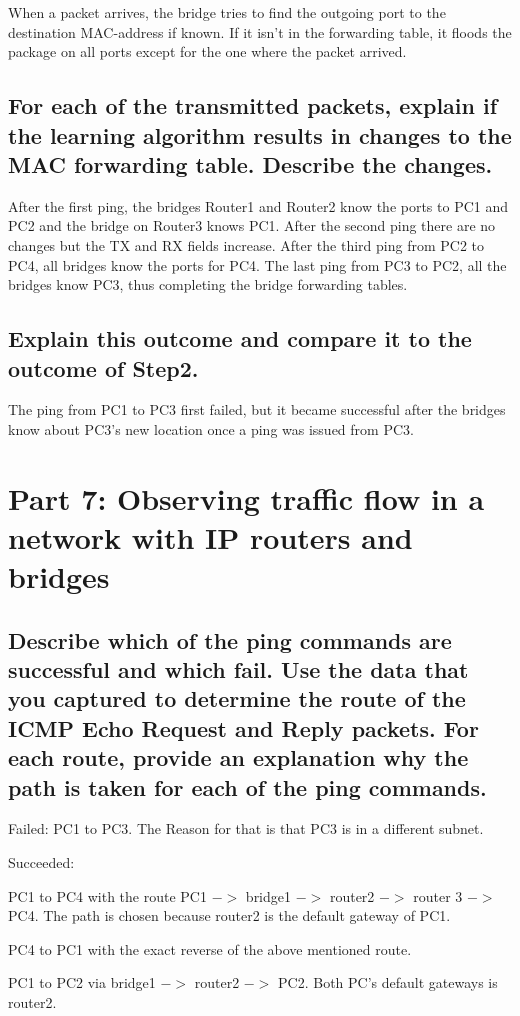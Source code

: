 \documentclass[a4paper, 11pt]{article}
\begin{document}
When a packet arrives, the bridge tries to find the outgoing port to the destination MAC-address if known. If it isn't in the forwarding table, it floods the package on all ports except for the one where the packet arrived.

\subsection{For each of the transmitted packets, explain if the learning algorithm results in changes to the MAC forwarding table. Describe the changes.  }

After the first ping, the bridges Router1 and Router2 know the ports to PC1 and PC2 and the bridge on Router3 knows PC1. After the second ping there are no changes but the  TX and RX fields increase. After the third ping from PC2 to PC4, all bridges know the ports for PC4. The last ping from PC3 to PC2, all the bridges know PC3, thus completing the bridge forwarding tables.

\subsection{Explain this outcome and compare it to the outcome of Step2. }

The ping from PC1 to PC3 first failed, but it became successful after the bridges know about PC3's new location once a ping was issued from PC3.

\section{Part 7: Observing traffic flow in a network with IP routers and bridges}

\subsection{Describe which of the ping commands are successful and which fail. Use the data that you captured to determine the route of the ICMP Echo Request and Reply packets. For each route, provide an explanation why the path is taken for each of the ping commands.  }

Failed: PC1 to PC3. The Reason for that is that PC3 is in a different subnet.

Succeeded: 

PC1 to PC4 with the route PC1 $->$ bridge1 $->$ router2 $->$ router 3 $->$ PC4. The path is chosen because router2 is the default gateway of PC1.

PC4 to PC1 with the exact reverse of the above mentioned route.

PC1 to PC2 via bridge1 $->$ router2 $->$ PC2. Both PC's default gateways is router2.
\end{document}
